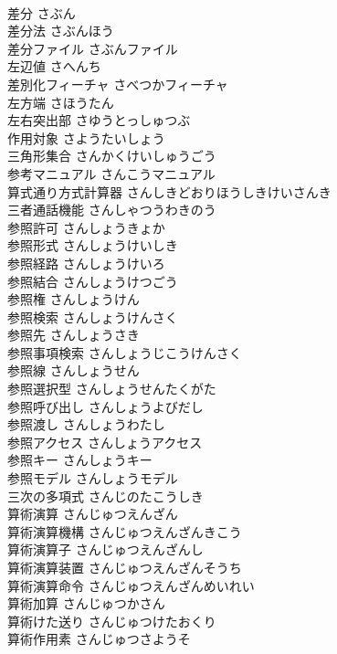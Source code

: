 \documentclass[8pt]{extreport}
\begin{document}
\begin{CJK}{UTF8}{min}
\\	差分	さぶん	
\\	差分法	さぶんほう	
\\	差分ファイル	さぶんファイル	
\\	左辺値	さへんち	
\\	差別化フィーチャ	さべつかフィーチャ	
\\	左方端	さほうたん	
\\	左右突出部	さゆうとっしゅつぶ	
\\	作用対象	さようたいしょう	
\\	三角形集合	さんかくけいしゅうごう	
\\	参考マニュアル	さんこうマニュアル	
\\	算式通り方式計算器	さんしきどおりほうしきけいさんき	
\\	三者通話機能	さんしゃつうわきのう	
\\	参照許可	さんしょうきょか	
\\	参照形式	さんしょうけいしき	
\\	参照経路	さんしょうけいろ	
\\	参照結合	さんしょうけつごう	
\\	参照権	さんしょうけん	
\\	参照検索	さんしょうけんさく	
\\	参照先	さんしょうさき	
\\	参照事項検索	さんしょうじこうけんさく	
\\	参照線	さんしょうせん	
\\	参照選択型	さんしょうせんたくがた	
\\	参照呼び出し	さんしょうよびだし	
\\	参照渡し	さんしょうわたし	
\\	参照アクセス	さんしょうアクセス	
\\	参照キー	さんしょうキー	
\\	参照モデル	さんしょうモデル	
\\	三次の多項式	さんじのたこうしき	
\\	算術演算	さんじゅつえんざん	
\\	算術演算機構	さんじゅつえんざんきこう	
\\	算術演算子	さんじゅつえんざんし	
\\	算術演算装置	さんじゅつえんざんそうち	
\\	算術演算命令	さんじゅつえんざんめいれい	
\\	算術加算	さんじゅつかさん	
\\	算術けた送り	さんじゅつけたおくり	
\\	算術作用素	さんじゅつさようそ	

\end{CJK}
\end{document}
